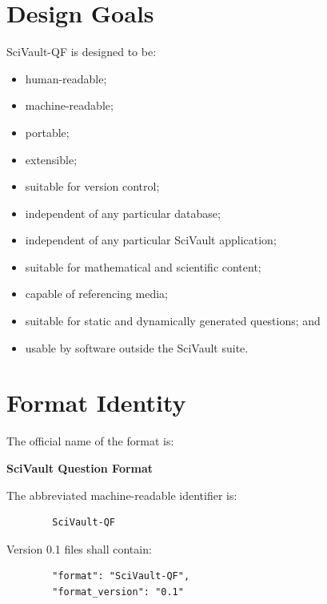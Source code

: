 \documentclass[11pt]{article}
\begin{document}
	\section{Design Goals}
	
	SciVault-QF is designed to be:
	
	\begin{itemize}
		\item human-readable;
		\item machine-readable;
		\item portable;
		\item extensible;
		\item suitable for version control;
		\item independent of any particular database;
		\item independent of any particular SciVault application;
		\item suitable for mathematical and scientific content;
		\item capable of referencing media;
		\item suitable for static and dynamically generated questions; and
		\item usable by software outside the SciVault suite.
	\end{itemize}
	
	\section{Format Identity}
	
	The official name of the format is:
	
	\begin{center}
		\textbf{SciVault Question Format}
	\end{center}
	
	The abbreviated machine-readable identifier is:
	
	\begin{lstlisting}
		SciVault-QF
	\end{lstlisting}
	
	Version 0.1 files shall contain:
	
	\begin{lstlisting}
		"format": "SciVault-QF",
		"format_version": "0.1"
	\end{lstlisting}
	
\end{document}
